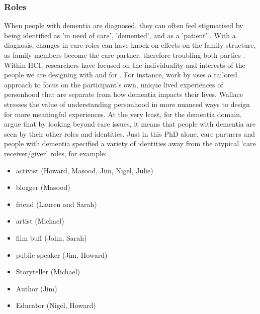 \subsubsection{Roles}
\label{Roles}
When people with dementia are diagnosed, they can often feel stigmatised by being identified as ’in need of care’, ’demented’, and  as a ’patient’ \citep{benbow_dementia_2012}. With a diagnosis, changes in care roles can have knock-on effects on the family structure, as family members become the care partner, therefore troubling both parties \citep{lee_technology-based_2015}. Within HCI, researchers have focused on the individuality and interests of the people we are designing with and for \citep{lazar_rethinking_2016,brankaert_intersections_2019,foley_printer_2019,mcnaney_demyouth:_2017}. For instance, work by \cite{wallace_design-led_2013} uses a tailored approach to focus on the participant's own, unique lived experiences of personhood that are separate from how dementia impacts their lives. Wallace stresses the value of understanding personhood in more nuanced ways to design for more meaningful experiences. At the very least, for the dementia domain, \cite{bartlett2010broadening} argue that by looking beyond care issues, it means that people with dementia are seen by their other roles and identities. Just in this PhD alone, care partners and people with dementia specified a variety of identities away from the atypical `care receiver/giver' roles, for example:

\begin{itemize}
\item	activist (Howard, Masood, Jim, Nigel, Julie)
\item	blogger (Masood)
\item	friend (Lauren and Sarah)
\item	artist (Michael)
\item	film buff (John, Sarah)
\item	public speaker (Jim, Howard)
\item	Storyteller (Michael)
\item	Author (Jim)
\item	Educator (Nigel, Howard)
\end{itemize}

